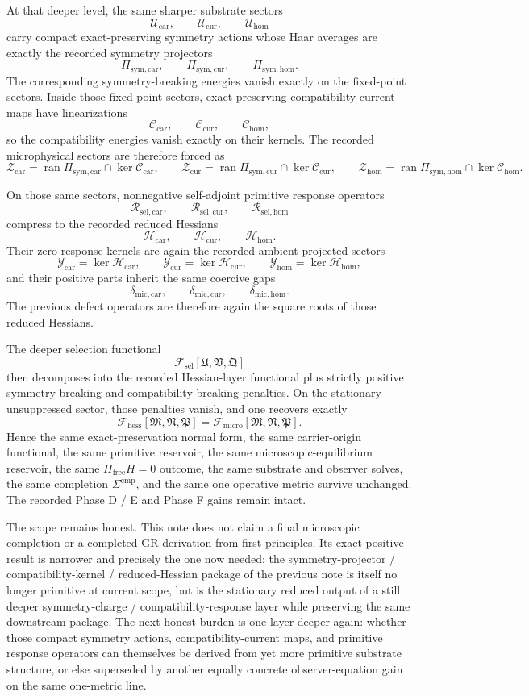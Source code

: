 \documentclass[11pt]{article}
\newcommand{\UltraFunctional}{\mathscr F_{\mathrm{micro}}}
\newcommand{\RootFunctional}{\mathscr F_{\mathrm{hess}}}
\newcommand{\StemFunctional}{\mathscr F_{\mathrm{sel}}}
\newcommand{\ProtoTensorClass}{\mathscr Y_{\mathrm{car}}}
\newcommand{\ProtoRelabelClass}{\mathscr Y_{\mathrm{cur}}}
\newcommand{\ProtoFreeClass}{\mathscr Y_{\mathrm{hom}}}
\newcommand{\UltraTensorClass}{\mathscr Z_{\mathrm{car}}}
\newcommand{\UltraRelabelClass}{\mathscr Z_{\mathrm{cur}}}
\newcommand{\UltraFreeClass}{\mathscr Z_{\mathrm{hom}}}
\newcommand{\UltraTensor}{\mathfrak M}
\newcommand{\UltraRelabel}{\mathfrak N}
\newcommand{\UltraFree}{\mathfrak P}
\newcommand{\UltraCarGap}{\delta_{\mathrm{mic,car}}}
\newcommand{\UltraCurGap}{\delta_{\mathrm{mic,cur}}}
\newcommand{\UltraHomGap}{\delta_{\mathrm{mic,hom}}}
\newcommand{\RootTensorClass}{\mathscr U_{\mathrm{car}}}
\newcommand{\RootRelabelClass}{\mathscr U_{\mathrm{cur}}}
\newcommand{\RootFreeClass}{\mathscr U_{\mathrm{hom}}}
\newcommand{\RootTensor}{\mathfrak U}
\newcommand{\RootRelabel}{\mathfrak V}
\newcommand{\RootFree}{\mathfrak Q}
\newcommand{\TensorSymProj}{\Pi_{\mathrm{sym,car}}}
\newcommand{\CurSymProj}{\Pi_{\mathrm{sym,cur}}}
\newcommand{\HomSymProj}{\Pi_{\mathrm{sym,hom}}}
\newcommand{\TensorCompat}{\mathcal C_{\mathrm{car}}}
\newcommand{\CurCompat}{\mathcal C_{\mathrm{cur}}}
\newcommand{\HomCompat}{\mathcal C_{\mathrm{hom}}}
\newcommand{\TensorHess}{\mathcal H_{\mathrm{car}}}
\newcommand{\CurHess}{\mathcal H_{\mathrm{cur}}}
\newcommand{\HomHess}{\mathcal H_{\mathrm{hom}}}
\newcommand{\TensorResp}{\mathcal R_{\mathrm{sel,car}}}
\newcommand{\CurResp}{\mathcal R_{\mathrm{sel,cur}}}
\newcommand{\HomResp}{\mathcal R_{\mathrm{sel,hom}}}
\begin{document}
At that deeper level, the same sharper substrate sectors
\[
\RootTensorClass,\qquad
\RootRelabelClass,\qquad
\RootFreeClass
\]
carry compact exact-preserving symmetry actions whose Haar averages are exactly the recorded symmetry projectors
\[
\TensorSymProj,\qquad
\CurSymProj,\qquad
\HomSymProj.
\]
The corresponding symmetry-breaking energies vanish exactly on the fixed-point sectors. Inside those fixed-point sectors, exact-preserving compatibility-current maps have linearizations
\[
\TensorCompat,\qquad
\CurCompat,\qquad
\HomCompat,
\]
so the compatibility energies vanish exactly on their kernels. The recorded microphysical sectors are therefore forced as
\[
\UltraTensorClass=\operatorname{ran}\TensorSymProj\cap\ker\TensorCompat,\qquad
\UltraRelabelClass=\operatorname{ran}\CurSymProj\cap\ker\CurCompat,\qquad
\UltraFreeClass=\operatorname{ran}\HomSymProj\cap\ker\HomCompat.
\]

On those same sectors, nonnegative self-adjoint primitive response operators
\[
\TensorResp,\qquad
\CurResp,\qquad
\HomResp
\]
compress to the recorded reduced Hessians
\[
\TensorHess,\qquad
\CurHess,\qquad
\HomHess.
\]
Their zero-response kernels are again the recorded ambient projected sectors
\[
\ProtoTensorClass=\ker\TensorHess,\qquad
\ProtoRelabelClass=\ker\CurHess,\qquad
\ProtoFreeClass=\ker\HomHess,
\]
and their positive parts inherit the same coercive gaps
\[
\UltraCarGap,\qquad
\UltraCurGap,\qquad
\UltraHomGap.
\]
The previous defect operators are therefore again the square roots of those reduced Hessians.

The deeper selection functional
\[
\StemFunctional[\RootTensor,\RootRelabel,\RootFree]
\]
then decomposes into the recorded Hessian-layer functional plus strictly positive symmetry-breaking and compatibility-breaking penalties. On the stationary unsuppressed sector, those penalties vanish, and one recovers exactly
\[
\RootFunctional[\UltraTensor,\UltraRelabel,\UltraFree]
=
\UltraFunctional[\UltraTensor,\UltraRelabel,\UltraFree].
\]
Hence the same exact-preservation normal form, the same carrier-origin functional, the same primitive reservoir, the same microscopic-equilibrium reservoir, the same \(\Pi_{\mathrm{free}}H=0\) outcome, the same substrate and observer solves, the same completion \(\Sigma^{\mathrm{cmp}}\), and the same one operative metric survive unchanged. The recorded Phase D / E and Phase F gains remain intact.

The scope remains honest. This note does not claim a final microscopic completion or a completed GR derivation from first principles. Its exact positive result is narrower and precisely the one now needed: the symmetry-projector / compatibility-kernel / reduced-Hessian package of the previous note is itself no longer primitive at current scope, but is the stationary reduced output of a still deeper symmetry-charge / compatibility-response layer while preserving the same downstream package. The next honest burden is one layer deeper again: whether those compact symmetry actions, compatibility-current maps, and primitive response operators can themselves be derived from yet more primitive substrate structure, or else superseded by another equally concrete observer-equation gain on the same one-metric line.
\end{document}
